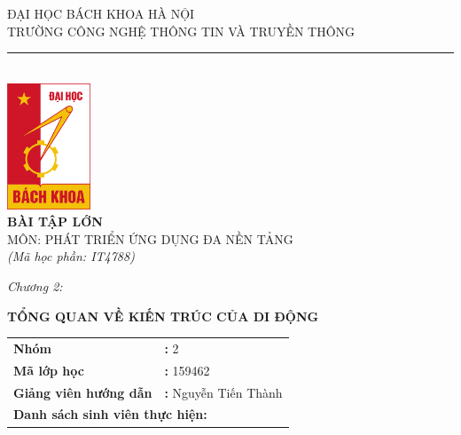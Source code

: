 \documentclass[12pt]{report}
\begin{document}
\thispagestyle{empty}


\begin{center}
    \vspace{-0.8cm}
    ĐẠI HỌC BÁCH KHOA HÀ NỘI\\
    TRƯỜNG CÔNG NGHỆ THÔNG TIN VÀ TRUYỀN THÔNG\\
    \rule{0.6\textwidth}{0.4pt} \\[0.9cm]
    \includegraphics[width=2.5cm]{images/logo.png} \\[1.4cm]
    {\LARGE \textbf{BÀI TẬP LỚN}}\\[0.3cm]
    {\normalsize MÔN: PHÁT TRIỂN ỨNG DỤNG ĐA NỀN TẢNG}\\
    \textit{(Mã học phần: IT4788)}\\[1.6cm]
    \raggedright \textit{\Large Chương 2:}\\
    \begin{center}
        \textbf{\Large TỔNG QUAN VỀ KIẾN TRÚC CỦA DI ĐỘNG}
    \end{center}
\end{center}

\vspace{2.6cm}

\hspace*{0.6cm}
\begin{tabular}{ll}
  \textbf{Nhóm} & \hspace{0.99cm}\textbf{:} 2 \\
  \textbf{Mã lớp học} & \hspace{0.99cm}\textbf{:} 159462 \\
  \textbf{Giảng viên hướng dẫn} & \hspace{0.99cm}\textbf{:} Nguyễn Tiến Thành \\
  \multicolumn{2}{l}{\textbf{Danh sách sinh viên thực hiện:}} \\
\end{tabular}
\end{document}
